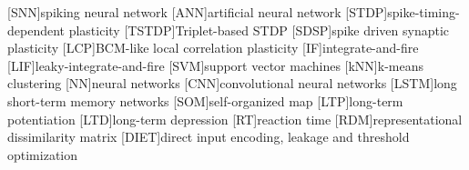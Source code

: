 \begin{acronym}[XXXX]
    [SNN]{spiking neural network}
    [ANN]{artificial neural network}
    [STDP]{spike-timing-dependent plasticity}
    [TSTDP]{Triplet-based STDP}
    [SDSP]{spike driven synaptic plasticity}
    [LCP]{BCM-like local correlation plasticity}
    [IF]{integrate-and-fire}
    [LIF]{leaky-integrate-and-fire}
    [SVM]{support vector machines}
    [kNN]{k-means clustering}
    [NN]{neural networks}
    [CNN]{convolutional neural networks}
    [LSTM]{long short-term memory networks}
    [SOM]{self-organized map}
    [LTP]{long-term potentiation}
    [LTD]{long-term depression}
    [RT]{reaction time}
    [RDM]{representational dissimilarity matrix}
    [DIET]{direct input encoding, leakage and threshold optimization}
\end{acronym}